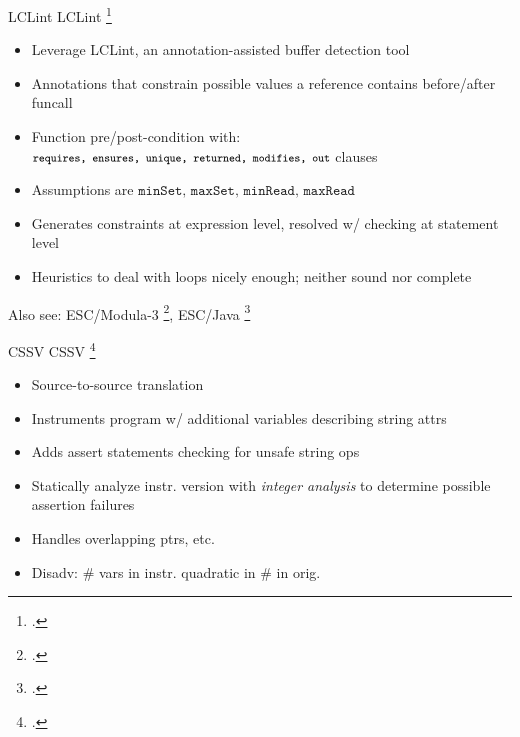 \documentclass[aspectratio=169]{beamer}
\begin{document}
\begin{frame}{LCLint}
LCLint \footcite{larochelle_statically_2001}
\begin{itemize}
    \item Leverage LCLint, an annotation-assisted buffer detection tool
    \item Annotations that constrain possible values a reference contains before/after funcall
    \item Function pre/post-condition with: $\footnotesize{\texttt{requires, ensures, unique, returned, modifies, out}}$ clauses
    \item Assumptions are $\texttt{minSet, maxSet, minRead, maxRead}$
    \item Generates constraints at expression level, resolved w/ checking at statement level
    \item Heuristics to deal with loops nicely enough; neither sound nor complete
\end{itemize}
    Also see: ESC/Modula-3 \footcite{detlefs_overview_1995}, ESC/Java \footcite{flanagan_extended_2002}
    \vspace{0.2in}
\end{frame}

\begin{frame}{CSSV}
CSSV \footcite{dor_cssv:_2003}
\begin{itemize}
    \item Source-to-source translation
    \item Instruments program w/ additional variables describing string attrs
    \item Adds assert statements checking for unsafe string ops
    \item Statically analyze instr. version with \emph{integer analysis} to determine possible assertion failures
    \item Handles overlapping ptrs, etc.
    \item Disadv: \# vars in instr. quadratic in \# in orig.
\end{itemize}
\end{frame}
\end{document}
